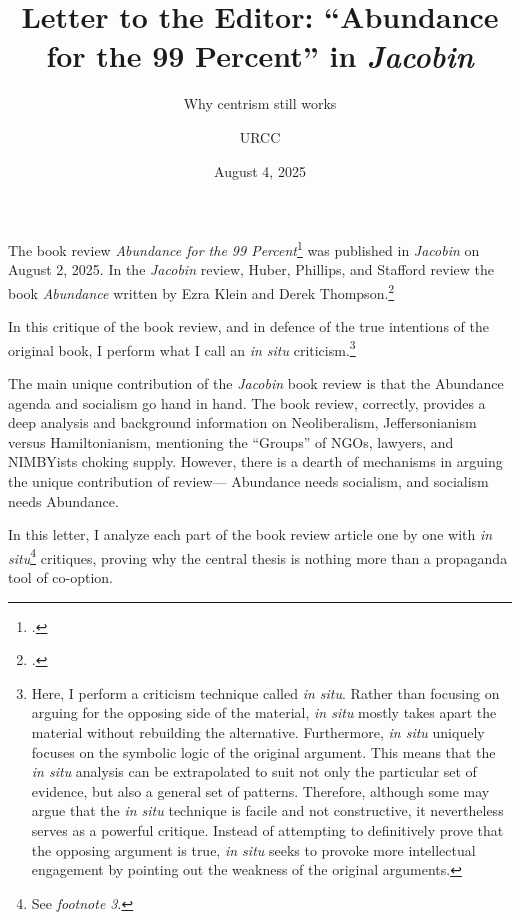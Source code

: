 \documentclass[12pt]{article}
\begin{document}
\title{Letter to the Editor: \enquote{Abundance for the 99 Percent} in \emph{Jacobin}}

\subtitle{Why centrism still works}

\author{URCC}

\date{August 4, 2025}

\maketitle

\begin{preamble}
	The book review \emph{Abundance for the 99 Percent}\footcite{huberAbundance99Percent2025} was published in \emph{Jacobin} on August 2, 2025. In the \emph{Jacobin} review, Huber, Phillips, and Stafford review the book \emph{Abundance} written by Ezra Klein and Derek Thompson.\footcite{kleinAbundance2025}

	In this critique of the book review, and in defence of the true intentions of the original book, I perform what I call an \emph{in situ} criticism.\footnote{Here, I perform a criticism technique called \emph{in situ}. Rather than focusing on arguing for the opposing side of the material, \emph{in situ} mostly takes apart the material without rebuilding the alternative. Furthermore, \emph{in situ} uniquely focuses on the symbolic logic of the original argument. This means that the \emph{in situ} analysis can be extrapolated to suit not only the particular set of evidence, but also a general set of patterns. Therefore, although some may argue that the \emph{in situ} technique is facile and not constructive, it nevertheless serves as a powerful critique. Instead of attempting to definitively prove that the opposing argument is true, \emph{in situ} seeks to provoke more intellectual engagement by pointing out the weakness of the original arguments.}
\end{preamble}

The main unique contribution of the \emph{Jacobin} book review is that the Abundance agenda and socialism go hand in hand. The book review, correctly, provides a deep analysis and background information on Neoliberalism, Jeffersonianism versus Hamiltonianism, mentioning the ``Groups'' of NGOs, lawyers, and NIMBYists choking supply. However, there is a dearth of mechanisms in arguing the unique contribution of review--- Abundance needs socialism, and socialism needs Abundance.

In this letter, I analyze each part of the book review article one by one with \emph{in situ}\footnote{See \emph{footnote 3}.} critiques, proving why the central thesis is nothing more than a propaganda tool of co-option.
\end{document}
